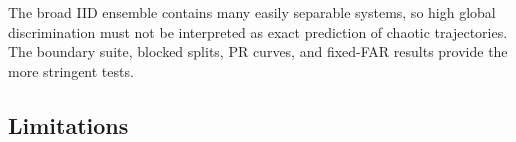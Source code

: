 The broad IID ensemble contains many easily separable systems, so high global
discrimination must not be interpreted as exact prediction of chaotic
trajectories. The boundary suite, blocked splits, PR curves, and fixed-FAR
results provide the more stringent tests.

\subsection{Limitations}
